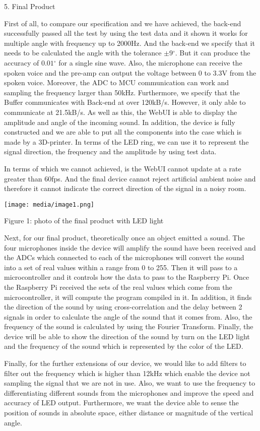 5. Final Product

First of all, to compare our specification and we have achieved, the
back-end successfully passed all the test by using the test data and it
shown it works for multiple angle with frequency up to 2000Hz. And the
back-end we specify that it needs to be calculated the angle with the
tolerance \(\pm 9{^\circ}\). But it can produce the accuracy of
\(0.01{^\circ}\) for a single sine wave. Also, the microphone can
receive the spoken voice and the pre-amp can output the voltage between
0 to 3.3V from the spoken voice. Moreover, the ADC to MCU communication
can work and sampling the frequency larger than 50kHz. Furthermore, we
specify that the Buffer communicates with Back-end at over 120kB/s.
However, it only able to communicate at 21.5kB/s. As well as this, the
WebUI is able to display the amplitude and angle of the incoming sound.
In addition, the device is fully constructed and we are able to put all
the components into the case which is made by a 3D-printer. In terms of
the LED ring, we can use it to represent the signal direction, the
frequency and the amplitude by using test data.

In terms of which we cannot achieved, is the WebUI cannot update at a
rate greater than 60fps. And the final device cannot reject artificial
ambient noise and therefore it cannot indicate the correct direction of
the signal in a noisy room.

\texttt{[image: media/image1.png]}

Figure 1: photo of the final product with LED light

Next, for our final product, theoretically once an object emitted a
sound. The four microphones inside the device will amplify the sound
have been received and the ADCs which connected to each of the
microphones will convert the sound into a set of real values within a
range from 0 to 255. Then it will pass to a microcontroller and it
controls how the data to pass to the Raspberry Pi. Once the Raspberry Pi
received the sets of the real values which come from the
microcontroller, it will compute the program compiled in it. In
addition, it finds the direction of the sound by using cross-correlation
and the delay between 2 signals in order to calculate the angle of the
sound that it comes from. Also, the frequency of the sound is calculated
by using the Fourier Transform. Finally, the device will be able to show
the direction of the sound by turn on the LED light and the frequency of
the sound which is represented by the color of the LED.

Finally, for the further extensions of our device, we would like to add
filters to filter out the frequency which is higher than 12kHz which
enable the device not sampling the signal that we are not in use. Also,
we want to use the frequency to differentiating different sounds from
the microphones and improve the speed and accuracy of LED output.
Furthermore, we want the device able to sense the position of sounds in
absolute space, either distance or magnitude of the vertical angle.
